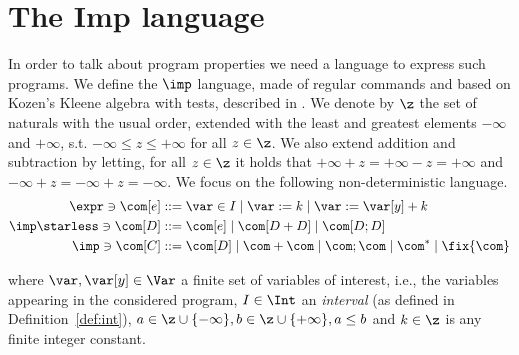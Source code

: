 \section{The Imp language}

In order to talk about program properties we need a language to
express such programs. We define the \(\imp\) language, made of
regular commands and based on Kozen’s Kleene algebra with tests,
described in \cite{kozen1997kleene}.  We denote by \(\z\) the set of
naturals with the usual order, extended with the least and greatest
elements \(-\infty\) and \(+\infty\), s.t.
\(-\infty \leq z \leq +\infty\) for all \(z \in \z\). We also extend
addition and subtraction by letting, for all \(z \in \z\) it holds
that \(+\infty + z = + \infty - z = + \infty\) and
\(-\infty + z = -\infty + z = -\infty\).  We focus on the following
non-deterministic language.
\begin{align*}
  \expr \ni \com[e] ::= & \; \var \in I %
                          \mid \var := k \mid \var := \var[y] + k %
  \\
  \imp\starless \ni \com[D] ::= & \; \com[e] \mid \com[D + D] \mid \com[D ; D] \\
  \imp \ni \com[C] ::= & \; \com[D] \mid \com + \com \mid \com ; \com \mid \com^* \mid \fix{\com}
\end{align*}

where \(\var, \var[y] \in \Var\) a finite set of variables of
interest, i.e., the variables appearing in the considered program,
\(I\in\Int\) an \emph{interval} (as defined in
Definition~\ref{def:int}),
\({a \in \z \cup \{-\infty\}}, {b \in \z \cup\{+\infty\}}, {a\leq b}\)
and \({k \in \z}\) is any finite integer constant.
